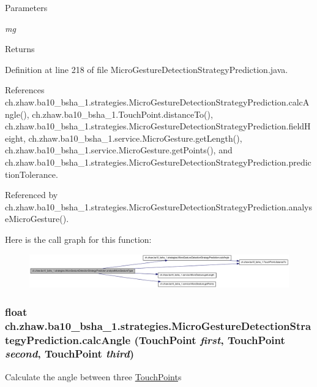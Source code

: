 \begin{DoxyParams}{Parameters}
\item[{\em mg}]\end{DoxyParams}
\begin{DoxyReturn}{Returns}

\end{DoxyReturn}


Definition at line 218 of file MicroGestureDetectionStrategyPrediction.java.

References ch.zhaw.ba10\_\-bsha\_\-1.strategies.MicroGestureDetectionStrategyPrediction.calcAngle(), ch.zhaw.ba10\_\-bsha\_\-1.TouchPoint.distanceTo(), ch.zhaw.ba10\_\-bsha\_\-1.strategies.MicroGestureDetectionStrategyPrediction.fieldHeight, ch.zhaw.ba10\_\-bsha\_\-1.service.MicroGesture.getLength(), ch.zhaw.ba10\_\-bsha\_\-1.service.MicroGesture.getPoints(), and ch.zhaw.ba10\_\-bsha\_\-1.strategies.MicroGestureDetectionStrategyPrediction.predictionTolerance.

Referenced by ch.zhaw.ba10\_\-bsha\_\-1.strategies.MicroGestureDetectionStrategyPrediction.analyseMicroGesture().

Here is the call graph for this function:\nopagebreak
\begin{figure}[H]
\begin{center}
\leavevmode
\includegraphics[width=420pt]{classch_1_1zhaw_1_1ba10__bsha__1_1_1strategies_1_1MicroGestureDetectionStrategyPrediction_a7a6bce4151aab292c0e6895257364601_cgraph}
\end{center}
\end{figure}
\hypertarget{classch_1_1zhaw_1_1ba10__bsha__1_1_1strategies_1_1MicroGestureDetectionStrategyPrediction_a853328dde879f43b609cf85e698c64cf}{
\subsubsection[{calcAngle}]{\setlength{\rightskip}{0pt plus 5cm}float ch.zhaw.ba10\_\-bsha\_\-1.strategies.MicroGestureDetectionStrategyPrediction.calcAngle ({\bf TouchPoint} {\em first}, \/  {\bf TouchPoint} {\em second}, \/  {\bf TouchPoint} {\em third})}}
\label{classch_1_1zhaw_1_1ba10__bsha__1_1_1strategies_1_1MicroGestureDetectionStrategyPrediction_a853328dde879f43b609cf85e698c64cf}
Calculate the angle between three \hyperlink{classch_1_1zhaw_1_1ba10__bsha__1_1_1TouchPoint}{TouchPoint}s


